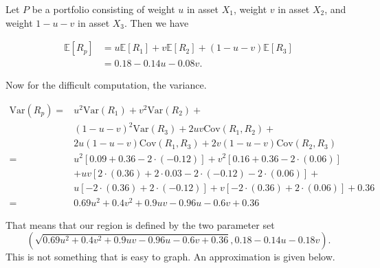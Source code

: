 \documentclass{ximera}
\begin{document}
\begin{solution}
Let $P$ be a portfolio consisting of weight $u$ in asset $X_1$, weight $v$ in asset $X_2$, and weight $1-u-v$ in asset $X_3$. Then we have

	\begin{align*}
	\mathbb{E}[R_p] 		&=u\mathbb{E}[R_1]+v\mathbb{E}[R_2]+(1-u-v)\mathbb{E}[R_3]\\
					&=0.18-0.14u-0.08v.
	\end{align*}

Now for the difficult computation, the variance.

	\begin{align*}
	\text{Var}(R_p) 	=&u^2\text{Var}(R_1)+v^2\text{Var}(R_2)+\\
				&(1-u-v)^2\text{Var}(R_3)+2uv\text{Cov}(R_1,R_2)+\\
				&2u(1-u-v)\text{Cov}(R_1, R_3)+2v(1-u-v)\text{Cov}(R_2, R_3)\\
				=&u^2[0.09+0.36-2\cdot(-0.12)]+v^2[0.16+0.36-2\cdot(0.06)]\\
				&+uv[2\cdot(0.36)+2\cdot0.03-2\cdot(-0.12)-2\cdot(0.06)]+\\
				&u[-2\cdot(0.36)+2\cdot(-0.12)]+v[-2\cdot(0.36)+2\cdot(0.06)]+0.36\\
				=&0.69u^2+0.4v^2+0.9uv-0.96u-0.6v+0.36
	\end{align*}

That means that our region is defined by the two parameter set
\[
(\sqrt{0.69u^2+0.4v^2+0.9uv-0.96u-0.6v+0.36}, 0.18-0.14u-0.18v).
\]
This is not something that is easy to graph. An approximation is given below.

\begin{center}
\end{center}
\end{solution}
\end{document}
